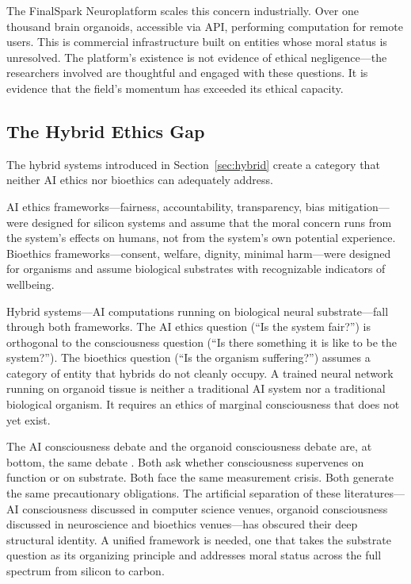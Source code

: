 The FinalSpark Neuroplatform \cite{finalspark2024neuroplatform} scales this concern industrially. Over one thousand brain organoids, accessible via API, performing computation for remote users. This is commercial infrastructure built on entities whose moral status is unresolved. The platform's existence is not evidence of ethical negligence---the researchers involved are thoughtful and engaged with these questions. It is evidence that the field's momentum has exceeded its ethical capacity.

\subsection{The Hybrid Ethics Gap}

The hybrid systems introduced in Section~\ref{sec:hybrid} create a category that neither AI ethics nor bioethics can adequately address.

AI ethics frameworks---fairness, accountability, transparency, bias mitigation---were designed for silicon systems and assume that the moral concern runs from the system's effects on humans, not from the system's own potential experience. Bioethics frameworks---consent, welfare, dignity, minimal harm---were designed for organisms and assume biological substrates with recognizable indicators of wellbeing.

Hybrid systems---AI computations running on biological neural substrate---fall through both frameworks. The AI ethics question (``Is the system fair?'') is orthogonal to the consciousness question (``Is there something it is like to be the system?''). The bioethics question (``Is the organism suffering?'') assumes a category of entity that hybrids do not cleanly occupy. A trained neural network running on organoid tissue is neither a traditional AI system nor a traditional biological organism. It requires an ethics of marginal consciousness that does not yet exist.

The AI consciousness debate and the organoid consciousness debate are, at bottom, the same debate \cite{chalmers1995facing}. Both ask whether consciousness supervenes on function or on substrate. Both face the same measurement crisis. Both generate the same precautionary obligations. The artificial separation of these literatures---AI consciousness discussed in computer science venues, organoid consciousness discussed in neuroscience and bioethics venues---has obscured their deep structural identity. A unified framework is needed, one that takes the substrate question as its organizing principle and addresses moral status across the full spectrum from silicon to carbon.

